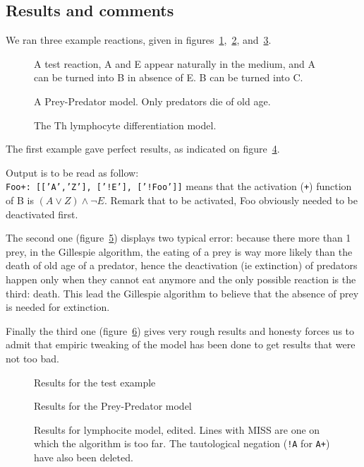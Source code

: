 \documentclass{llncs}
\begin{document}
\subsection{Results and comments}

We ran three example reactions, given in figures~\ref{test},~\ref{preypred}, and~\ref{lympho}.
\begin{figure}[htbp]
	
	\vspace{-1em}
	\caption{A test reaction, A and E appear naturally in the medium, and A can be turned into B in absence of E. B  can be turned into C.\label{test}}
\end{figure}
\begin{figure}[htbp]
	
	\vspace{-1em}
	\caption{A Prey-Predator model. Only predators die of old age.\label{preypred}}
\end{figure}
\begin{figure}[htbp]
	
	\vspace{-1em}
	\caption{The Th lymphocyte differentiation model.\label{lympho}}
\end{figure}

The first example gave perfect results, as indicated on figure~\ref{test_res}.

Output is to be read as follow:\\
\texttt{Foo+:~[['A','Z'],~['!E'],~['!Foo']]} means that the activation (\texttt{+}) function of B is $(A \vee Z)\wedge\neg E$. Remark that to be activated, Foo obviously needed to be deactivated first.

The second one (figure~\ref{preypred_res}) displays two typical error: because there more than 1 prey, in the Gillespie algorithm, the eating of a prey is way more likely than the death of old age of a predator, hence the deactivation (ie extinction) of predators happen only when they cannot eat anymore and the only possible reaction is the third: death. This lead the Gillespie algorithm to believe that the absence of prey is needed for extinction.

Finally the third one (figure~\ref{lympho_res}) gives very rough results and honesty forces us to admit that empiric tweaking of the model has been done to get results that were not too bad.

\begin{figure}
	
	\caption{Results for the test example \label{test_res}}
\end{figure}
\begin{figure}
	
	\caption{Results for the Prey-Predator model\label{preypred_res}}
\end{figure}
\begin{figure}
	
	\caption{Results for lymphocite model, edited. Lines with MISS are one on which the algorithm is too far. The tautological negation (\texttt{!A} for \texttt{A+}) have also been deleted.\label{lympho_res}}
\end{figure}
\end{document}
